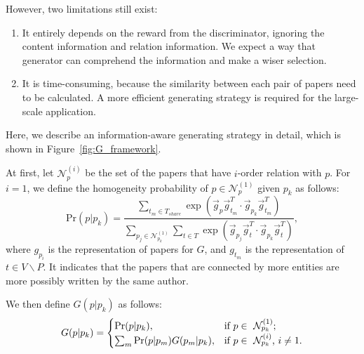 \documentclass[letterpaper]{article} %
\begin{document}
However, two limitations still exist: 
\begin{enumerate}
\item It entirely depends on the reward from the discriminator, ignoring the content information and relation information. 
We expect a way that generator can comprehend the information and make a wiser selection.

\item  It is time-consuming, because the similarity between each pair of papers need to be calculated. A more efficient generating strategy is required for the large-scale application.

\end{enumerate}

Here, we describe an information-aware generating strategy in detail, which is shown in Figure~\ref{fig:G_framework}.

At first, let $\mathcal{N}_p^{(i)}$ be the set of the papers that have $i$-order relation with $p$. 
For $i=1$, we define the homogeneity probability of $p \in \mathcal{N}_p^{(1)}$ given $p_k$ as follows:
\begin{equation}
\text{Pr}(p|p_k) = \frac{\sum_{t_m \in T_{share}}\exp(\vec{g}_{p}\vec{g}_{t_m}^T\cdot 
\vec{g}_{p_k}\vec{g}_{t_m}^T)}{\sum_{p_j \in \mathcal{N}_{p_k}^{(1)}}\sum_{t \in T} 
\exp(\vec{g}_{p_j}\vec{g}_{t}^T\cdot \vec{g}_{p_k}\vec{g}_{t}^T)},
\label{eq:pairwise}
\end{equation}
where $g_{p_i}$ is the representation of papers for $G$, and $g_{t_m}$ is the representation of $t \in V \backslash P$. 
It indicates that the papers that are connected by more entities are more possibly written by the same author. 

We then define $G(p|p_k)$ as follows:
{\small
\begin{align}
\centering
G(p|p_k) = \begin{cases} \text{Pr}(p|p_k), & \mbox{if } p \in \mbox{ $\mathcal{N}_{p_k}^{(1)}$}; \label{eq:G}
\\ \sum_m\text{Pr}(p|p_m)G(p_m|p_k), & \mbox{if } p \in \mbox{ $\mathcal{N}_{p_k}^{(i)}$, $i\neq 1$}.
\end{cases}
\end{align}}
\end{document}
